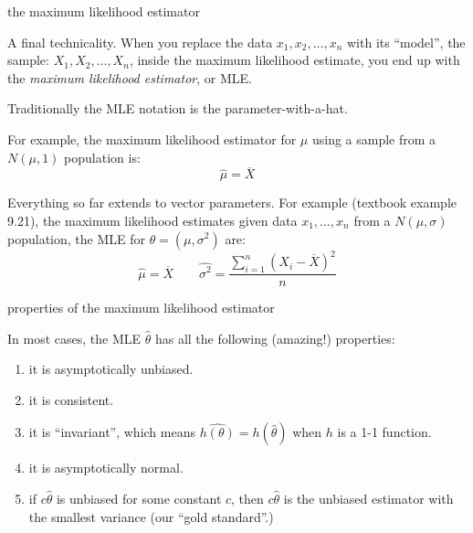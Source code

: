 \documentclass[ignorenonframetext,aspectratio=169]{beamer}
\newcommand\ol{\overline}
\begin{document}
\begin{frame}{the maximum likelihood estimator}

A final technicality. When you replace the data \(x_1,x_2,\ldots,x_n\)
with its ``model'', the sample: \(X_1,X_2,\ldots,X_n\), inside the
maximum likelihood estimate, you end up with the
\textit{maximum likelihood estimator}, or MLE.

Traditionally the MLE notation is the parameter-with-a-hat.

\pause For example, the maximum likelihood estimator for \(\mu\) using a
sample from a \(N(\mu,1)\) population is: \[\hat\mu = \ol{X}\]

Everything so far extends to vector parameters. For example (textbook
example 9.21), the maximum likelihood estimates given data
\(x_1,\ldots,x_n\) from a \(N(\mu, \sigma)\) population, the MLE for
\(\theta=(\mu,\sigma^2)\) are:
\[\hat\mu = \ol{X} \qquad \widehat{\sigma^2} = \frac{\sum_{i=1}^n \left(X_i-\ol{X}\right)^2}{n}\]

\end{frame}

\begin{frame}{properties of the maximum likelihood estimator}

In most cases, the MLE \(\hat\theta\) has all the following (amazing!)
properties:

\begin{enumerate}[<+->]
\def\labelenumi{\arabic{enumi}.}
\item
  it is asymptotically unbiased.
\item
  it is consistent.
\item
  it is ``invariant'', which means
  \(\widehat{h(\theta)} = h(\hat\theta)\) when \(h\) is a 1-1 function.
\item
  it is asymptotically normal.
\item
  if \(c\hat\theta\) is unbiased for some constant \(c\), then
  \(c\hat\theta\) is the unbiased estimator with the smallest variance
  (our ``gold standard''.)
\end{enumerate}

\end{frame}
\end{document}
